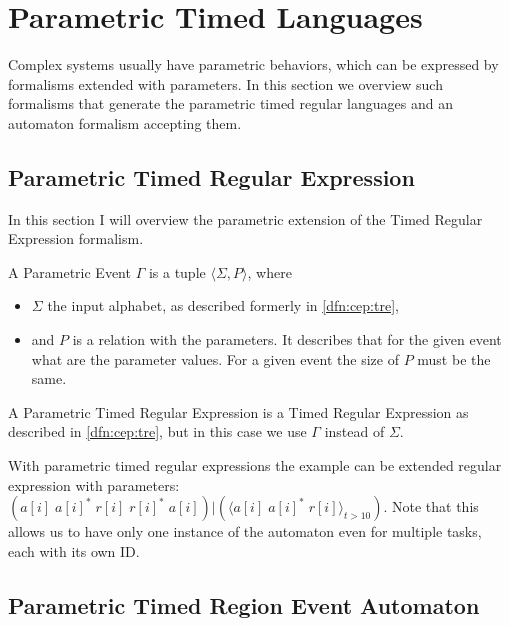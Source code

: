 	
	\section{Parametric Timed Languages}
	
			Complex systems usually have parametric behaviors, which can be expressed by formalisms extended with parameters. In this section we overview such formalisms that generate the parametric timed regular languages and an automaton formalism accepting them.
			
		\subsection{Parametric Timed Regular Expression}
		
		In this section I will overview the parametric extension of the Timed Regular Expression formalism.
			
			\begin{dfn}
				\label{dfn:cep:ptrea:event}
				A Parametric Event $\Gamma$ is a tuple $\langle \Sigma, P \rangle$, where 
				\begin{itemize}
					\item $\Sigma$ the input alphabet, as described formerly in \cref{dfn:cep:tre},
					\item and $P$ is a relation with the parameters. It describes that for the given event what are the parameter values. For a given event the size of $P$ must be the same.
				\end{itemize}
			\end{dfn}
			
	
			\begin{dfn}
			A Parametric Timed Regular Expression is a Timed Regular Expression as described in \cref{dfn:cep:tre}, but in this case we use $\Gamma$ instead of $\Sigma$.
			
			\end{dfn}
			
			With parametric timed regular expressions the example can be extended regular expression with parameters:
			$(a[i] \; a[i]^\ast \; r[i] \; r[i]^\ast \; a[i]) | (\langle a[i] \; a[i]^\ast \; r[i]\rangle_{t > 10} )$.
			Note that this allows us to have only one instance of the automaton even for multiple tasks, each with its own ID.
		
		\subsection{Parametric Timed Region Event Automaton}
			
